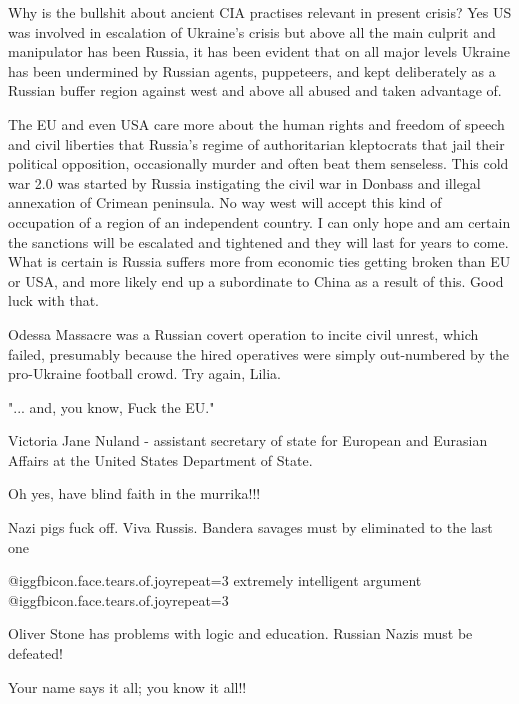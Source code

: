 \begin{itemize}
\begin{itemize}

Why is the bullshit about ancient CIA practises relevant in present crisis? Yes
US was involved in escalation of Ukraine's crisis but above all the main
culprit and manipulator has been Russia, it has been evident that on all major
levels Ukraine has been undermined by Russian agents, puppeteers, and kept
deliberately as a Russian buffer region against west and above all abused and
taken advantage of.

The EU and even USA care more about the human rights and freedom of speech and
civil liberties that Russia's regime of authoritarian kleptocrats that jail
their political opposition, occasionally murder and often beat them senseless.
This cold war 2.0 was started by Russia instigating the civil war in Donbass
and illegal annexation of Crimean peninsula. No way west will accept this kind
of occupation of a region of an independent country. I can only hope and am
certain the sanctions will be escalated and tightened and they will last for
years to come. What is certain is Russia suffers more from economic ties
getting broken than EU or USA, and more likely end up a subordinate to China as
a result of this. Good luck with that.


Odessa Massacre was a Russian covert operation to incite civil unrest, which
failed, presumably because the hired operatives were simply out-numbered by the
pro-Ukraine football crowd. Try again, Lilia.


"... and, you know, Fuck the EU."

Victoria Jane Nuland - assistant secretary of state for European and Eurasian
Affairs at the United States Department of State.

Oh yes, have blind faith in the murrika!!!


Nazi pigs fuck off. Viva Russis. Bandera savages must by eliminated to the last
one


@igg{fbicon.face.tears.of.joy}{repeat=3} extremely intelligent argument
@igg{fbicon.face.tears.of.joy}{repeat=3} 

Oliver Stone has problems with logic and education.
Russian Nazis must be defeated!

Your name says it all; you know it all!!


\end{itemize}
\end{itemize}

